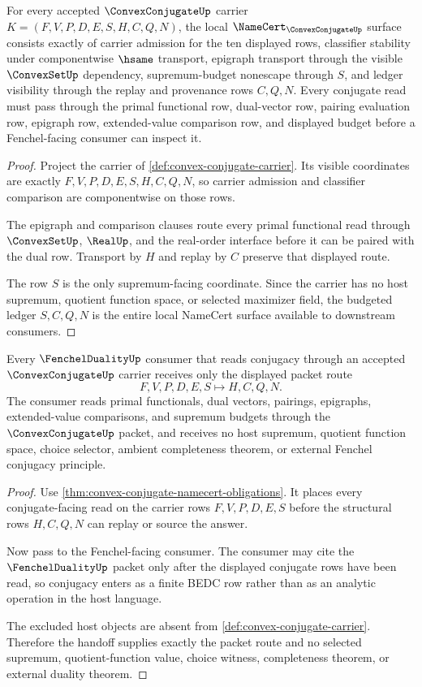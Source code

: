 \begin{theorem}\label{thm:convex-conjugate-namecert-obligations}
For every accepted $\ConvexConjugateUp$ carrier $K=(F,V,P,D,E,S,H,C,Q,N)$, the local $\NameCert_{\ConvexConjugateUp}$ surface consists exactly of carrier admission for the ten displayed rows, classifier stability under componentwise $\hsame$ transport, epigraph transport through the visible $\ConvexSetUp$ dependency, supremum-budget nonescape through $S$, and ledger visibility through the replay and provenance rows $C,Q,N$. Every conjugate read must pass through the primal functional row, dual-vector row, pairing evaluation row, epigraph row, extended-value comparison row, and displayed budget before a Fenchel-facing consumer can inspect it.
\end{theorem}
\begin{proof}
Project the carrier of \autoref{def:convex-conjugate-carrier}. Its visible coordinates are exactly $F,V,P,D,E,S,H,C,Q,N$, so carrier admission and classifier comparison are componentwise on those rows.

The epigraph and comparison clauses route every primal functional read through $\ConvexSetUp$, $\RealUp$, and the real-order interface before it can be paired with the dual row. Transport by $H$ and replay by $C$ preserve that displayed route.

The row $S$ is the only supremum-facing coordinate. Since the carrier has no host supremum, quotient function space, or selected maximizer field, the budgeted ledger $S,C,Q,N$ is the entire local NameCert surface available to downstream consumers.
\end{proof}

\begin{theorem}\label{thm:convex-conjugate-fenchel-handoff}
Every $\FenchelDualityUp$ consumer that reads conjugacy through an accepted $\ConvexConjugateUp$ carrier receives only the displayed packet route
$$
F,V,P,D,E,S\longmapsto H,C,Q,N.
$$
The consumer reads primal functionals, dual vectors, pairings, epigraphs, extended-value comparisons, and supremum budgets through the $\ConvexConjugateUp$ packet, and receives no host supremum, quotient function space, choice selector, ambient completeness theorem, or external Fenchel conjugacy principle.
\end{theorem}
\begin{proof}
Use \autoref{thm:convex-conjugate-namecert-obligations}. It places every conjugate-facing read on the carrier rows $F,V,P,D,E,S$ before the structural rows $H,C,Q,N$ can replay or source the answer.

Now pass to the Fenchel-facing consumer. The consumer may cite the $\FenchelDualityUp$ packet only after the displayed conjugate rows have been read, so conjugacy enters as a finite BEDC row rather than as an analytic operation in the host language.

The excluded host objects are absent from \autoref{def:convex-conjugate-carrier}. Therefore the handoff supplies exactly the packet route and no selected supremum, quotient-function value, choice witness, completeness theorem, or external duality theorem.
\end{proof}

